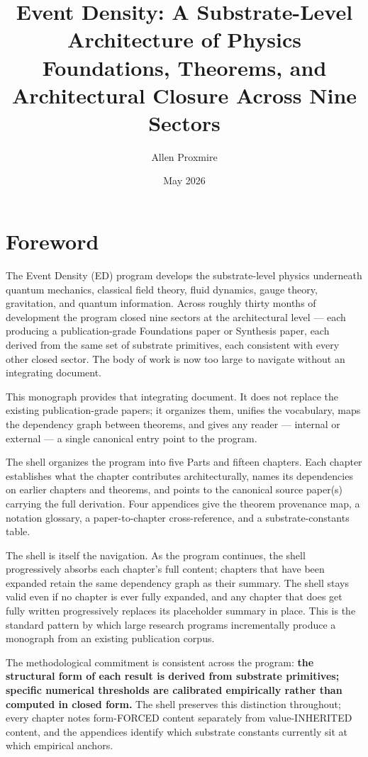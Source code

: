 \documentclass[11pt]{book}
\title{Event Density: A Substrate-Level Architecture of Physics\\[0.5em]
\large Foundations, Theorems, and Architectural Closure Across Nine Sectors}
\author{Allen Proxmire}
\date{May 2026}
\begin{document}
\frontmatter
\maketitle
\tableofcontents
\mainmatter


\chapter*{Foreword}

The Event Density (ED) program develops the substrate-level physics underneath quantum mechanics, classical field theory, fluid dynamics, gauge theory, gravitation, and quantum information. Across roughly thirty months of development the program closed nine sectors at the architectural level — each producing a publication-grade Foundations paper or Synthesis paper, each derived from the same set of substrate primitives, each consistent with every other closed sector. The body of work is now too large to navigate without an integrating document.

This monograph provides that integrating document. It does not replace the existing publication-grade papers; it organizes them, unifies the vocabulary, maps the dependency graph between theorems, and gives any reader — internal or external — a single canonical entry point to the program.

The shell organizes the program into five Parts and fifteen chapters. Each chapter establishes what the chapter contributes architecturally, names its dependencies on earlier chapters and theorems, and points to the canonical source paper(s) carrying the full derivation. Four appendices give the theorem provenance map, a notation glossary, a paper-to-chapter cross-reference, and a substrate-constants table.

The shell is itself the navigation. As the program continues, the shell progressively absorbs each chapter's full content; chapters that have been expanded retain the same dependency graph as their summary. The shell stays valid even if no chapter is ever fully expanded, and any chapter that does get fully written progressively replaces its placeholder summary in place. This is the standard pattern by which large research programs incrementally produce a monograph from an existing publication corpus.

The methodological commitment is consistent across the program: \textbf{the structural form of each result is derived from substrate primitives; specific numerical thresholds are calibrated empirically rather than computed in closed form.} The shell preserves this distinction throughout; every chapter notes form-FORCED content separately from value-INHERITED content, and the appendices identify which substrate constants currently sit at which empirical anchors.
\end{document}
